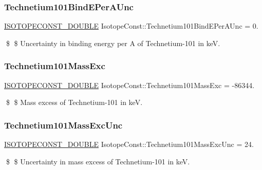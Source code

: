 \subsubsection{\texorpdfstring{Technetium101\+Bind\+E\+Per\+A\+Unc}{Technetium101BindEPerAUnc}}
{\footnotesize\ttfamily \mbox{\hyperlink{group___isotope_const-_macros_ga8f45a7272ce02c0b4c65c44636ed719a}{I\+S\+O\+T\+O\+P\+E\+C\+O\+N\+S\+T\+\_\+\+D\+O\+U\+B\+LE}} Isotope\+Const\+::\+Technetium101\+Bind\+E\+Per\+A\+Unc = 0.}

\$ \$ Uncertainty in binding energy per A of Technetium-\/101 in keV. \mbox{\label{group___isotope_const-_technetium-_tc101_ga6d3ffecb53132d56d8fda6e4e94fcbc8}} 
\subsubsection{\texorpdfstring{Technetium101\+Mass\+Exc}{Technetium101MassExc}}
{\footnotesize\ttfamily \mbox{\hyperlink{group___isotope_const-_macros_ga8f45a7272ce02c0b4c65c44636ed719a}{I\+S\+O\+T\+O\+P\+E\+C\+O\+N\+S\+T\+\_\+\+D\+O\+U\+B\+LE}} Isotope\+Const\+::\+Technetium101\+Mass\+Exc = -\/86344.}

\$ \$ Mass excess of Technetium-\/101 in keV. \mbox{\label{group___isotope_const-_technetium-_tc101_gaf64ca18ecb8792731012807441da9bbf}} 
\subsubsection{\texorpdfstring{Technetium101\+Mass\+Exc\+Unc}{Technetium101MassExcUnc}}
{\footnotesize\ttfamily \mbox{\hyperlink{group___isotope_const-_macros_ga8f45a7272ce02c0b4c65c44636ed719a}{I\+S\+O\+T\+O\+P\+E\+C\+O\+N\+S\+T\+\_\+\+D\+O\+U\+B\+LE}} Isotope\+Const\+::\+Technetium101\+Mass\+Exc\+Unc = 24.}

\$ \$ Uncertainty in mass excess of Technetium-\/101 in keV. \mbox{\label{group___isotope_const-_technetium-_tc101_ga141b89b8c94f0f05c85519a392896c28}} 
